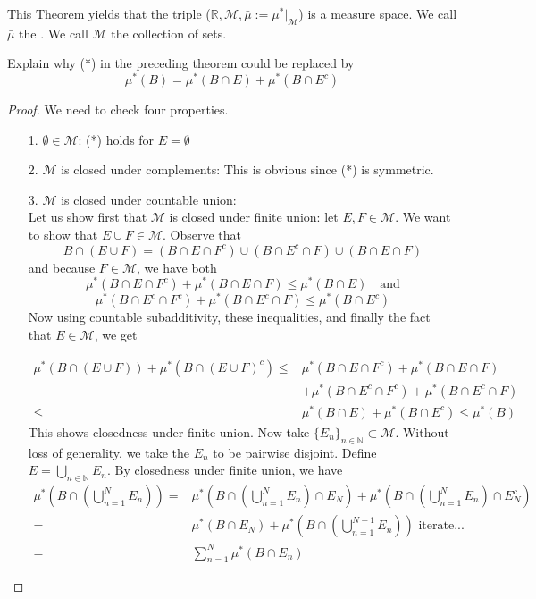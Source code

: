 \documentclass[11pt]{scrartcl}
\begin{document}
\begin{example}
This Theorem yields that the triple ($\mathbb{R},\mathcal{M},\bar{\mu}:=\mu^*|_\mathcal{M} $) is a measure space. We call $\bar{\mu}$ the . We call $\mathcal{M}$ the collection of  sets.
\end{example}

\begin{exercise}
Explain why (*) in the preceding theorem could be replaced by\\
$$\mu^*(B) = \mu^*(B\cap E) + \mu^*(B \cap E^c)$$
\end{exercise}

\begin{proof}
We need to check four properties. \\
\begin{itemize}
\item[1.] $\emptyset \in \mathcal{M}$: (*) holds for $E = \emptyset$ \\
\item[2.] $\mathcal{M}$ is closed under complements: This is obvious since (*) is symmetric.\\
\item[3.] $\mathcal{M}$ is closed under countable union: \\ 
Let us show first that $\mathcal{M}$ is closed under finite union: let $E,F \in \mathcal{M}$. We want to show that $E \cup F \in \mathcal{M}$. Observe that 
$$ B\cap (E \cup F) = (B\cap E \cap F^c) \cup (B\cap E^c \cap F) \cup (B\cap E \cap F)$$ and because $F\in \mathcal{M}$, we have both
$$\mu^*(B\cap E \cap F^c) + \mu^*(B\cap E \cap F) \leq \mu^*(B\cap E) \quad \text{and}$$
$$\mu^*(B\cap E^c \cap F^c) + \mu^*(B\cap E^c \cap F) \leq \mu^*(B\cap E^c)$$
Now using countable subadditivity, these inequalities, and finally the fact that $E \in \mathcal{M}$, we get

\begin{align*}
\mu^*(B\cap (E \cup F)) + \mu^*(B\cap (E \cup F)^c) {} \leq & \mu^*(B\cap E \cap F^c) + \mu^*(B\cap E \cap F)\\
& + \mu^*(B\cap E^c \cap F^c) + \mu^*(B\cap E^c \cap F) \\
\leq & \mu^*(B\cap E) + \mu^*(B\cap E^c) \leq \mu^*(B) 
\end{align*}
This shows closedness under finite union.
Now take $\{E_n\}_{n\in \mathbb{N}}\subset \mathcal{M}$. Without loss of generality, we take the $E_n$ to be pairwise disjoint. Define $ E  = \bigcup_{n\in \mathbb{N}} E_n$. By closedness under finite union, we have 
\begin{align*}
\mu^*(B\cap (\bigcup_{n=1}^N E_n)) = & \mu^*(B\cap (\bigcup_{n=1}^N E_n) \cap E_N) + \mu^*(B\cap (\bigcup_{n=1}^N E_n) \cap E_N^c) \\
 = & \mu^*(B \cap E_N) + \mu^*(B\cap (\bigcup_{n=1}^{N-1} E_n)) \text{  iterate...}\\
 =  & \sum_{n=1}^N \mu^*(B \cap E_n)
\end{align*}


\end{itemize}
\end{proof}
\end{document}
